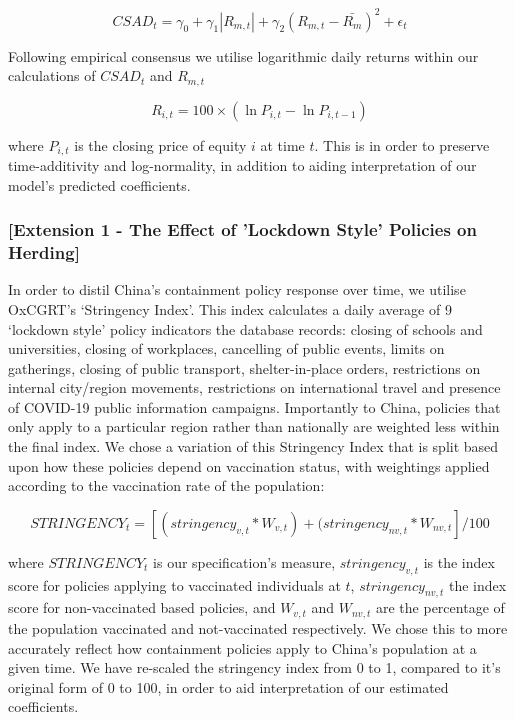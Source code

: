 \documentclass[12pt]{article}
\numberwithin{table}{section}   %
\begin{document}
\begin{equation}\label{model-1}
    CSAD_t=\gamma_0+\gamma_1 |R_{m,t}|+\gamma_2 (R_{m,t}-\bar{R_m})^2+\epsilon_t
\end{equation}

Following empirical consensus \citep{yao, tan, chiang} we utilise logarithmic daily returns within our calculations of $CSAD_t$ and $R_{m,t}$

$$
R_{i,t}=100\times(\ln{P_{i,t}}-\ln{P_{i,t-1}})
$$

where $P_{i,t}$ is the closing price of equity $i$ at time $t$. This is in order to preserve time-additivity and log-normality, in addition to aiding interpretation of our model’s predicted coefficients.

\subsubsection*{[Extension 1 - The Effect of 'Lockdown Style' Policies on Herding]}

In order to distil China’s containment policy response over time, we utilise OxCGRT’s ‘Stringency Index’. This index calculates a daily average of 9 ‘lockdown style’ policy indicators the database records: closing of schools and universities, closing of workplaces, cancelling of public events, limits on gatherings, closing of public transport, shelter-in-place orders, restrictions on internal city/region movements, restrictions on international travel and presence of COVID-19 public information campaigns. Importantly to China, policies that only apply to a particular region rather than nationally are weighted less within the final index. We chose a variation of this Stringency Index that is split based upon how these policies depend on vaccination status, with weightings applied according to the vaccination rate of the population:

$$
STRINGENCY_t=[(stringency_{v,t}*W_{v,t})+(stringency_{nv,t}*W_{nv,t}]/100
$$


where $STRINGENCY_t$ is our specification’s measure, $stringency_{v,t}$ is the index score for policies applying to vaccinated individuals at $t$, $stringency_{nv,t}$ the index score for non-vaccinated based policies, and $W_{v,t}$ and $W_{nv,t}$ are the percentage of the population vaccinated and not-vaccinated respectively. We chose this to more accurately reflect how containment policies apply to China’s population at a given time. We have re-scaled the stringency index from 0 to 1, compared to it's original form of 0 to 100, in order to aid interpretation of our estimated coefficients.
\end{document}
